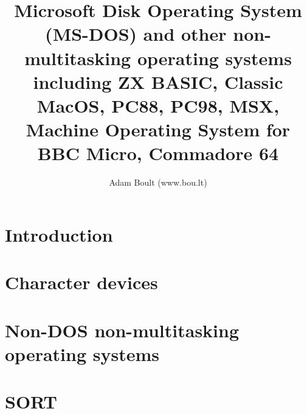 \documentclass[oneside]{book}
\begin{document}
\author{Adam Boult (www.bou.lt)}
\title{Microsoft Disk Operating System (MS-DOS) and other non-multitasking operating systems including ZX BASIC, Classic MacOS, PC88, PC98, MSX, Machine Operating System for BBC Micro, Commadore 64}
\maketitle

\setcounter{tocdepth}{0}
\tableofcontents



\part{Introduction}

\part{Character devices}


\part{Non-DOS non-multitasking operating systems}

\part{SORT}

\end{document}
